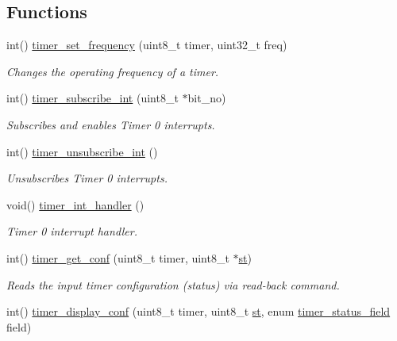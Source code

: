 \subsection*{Functions}
\begin{DoxyCompactItemize}
\item 
int() \hyperlink{group__timer_gaf2c04fa8e97ffa748fd3f612886a92a7}{timer\+\_\+set\+\_\+frequency} (uint8\+\_\+t timer, uint32\+\_\+t freq)
\begin{DoxyCompactList}\small\item\em Changes the operating frequency of a timer. \end{DoxyCompactList}\item 
int() \hyperlink{group__timer_gac57a7e1140a7e00ad95ac5488d2a671b}{timer\+\_\+subscribe\+\_\+int} (uint8\+\_\+t $\ast$bit\+\_\+no)
\begin{DoxyCompactList}\small\item\em Subscribes and enables Timer 0 interrupts. \end{DoxyCompactList}\item 
int() \hyperlink{group__timer_gafabd21de449be154dd65d5fdb2d8045d}{timer\+\_\+unsubscribe\+\_\+int} ()
\begin{DoxyCompactList}\small\item\em Unsubscribes Timer 0 interrupts. \end{DoxyCompactList}\item 
void() \hyperlink{group__timer_ga91a2072306c68353712a6b771287dc2c}{timer\+\_\+int\+\_\+handler} ()
\begin{DoxyCompactList}\small\item\em Timer 0 interrupt handler. \end{DoxyCompactList}\item 
int() \hyperlink{group__timer_ga703c60b40c8c49607d6ecb6fef82d27a}{timer\+\_\+get\+\_\+conf} (uint8\+\_\+t timer, uint8\+\_\+t $\ast$\hyperlink{group__mouse_ga9a379079ab305d43e4c73334578f9325}{st})
\begin{DoxyCompactList}\small\item\em Reads the input timer configuration (status) via read-\/back command. \end{DoxyCompactList}\item 
int() \hyperlink{group__timer_ga140d8f092c0913cabdca949c4a1cc650}{timer\+\_\+display\+\_\+conf} (uint8\+\_\+t timer, uint8\+\_\+t \hyperlink{group__mouse_ga9a379079ab305d43e4c73334578f9325}{st}, enum \hyperlink{group__timer_gada782f3116a896caaa602b70c0c6d8b7}{timer\+\_\+status\+\_\+field} field)

\end{DoxyCompactItemize}

